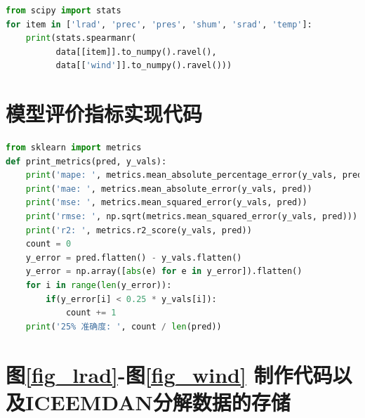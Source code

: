 \documentclass[AutoFakeBold]{LZUThesis}
\begin{document}
\begin{lstlisting}[language = python]
from scipy import stats
for item in ['lrad', 'prec', 'pres', 'shum', 'srad', 'temp']:
    print(stats.spearmanr(
          data[[item]].to_numpy().ravel(),
          data[['wind']].to_numpy().ravel()))
\end{lstlisting}

\section{模型评价指标实现代码}

\begin{lstlisting}[language = python]
from sklearn import metrics
def print_metrics(pred, y_vals):
    print('mape: ', metrics.mean_absolute_percentage_error(y_vals, pred))
    print('mae: ', metrics.mean_absolute_error(y_vals, pred))
    print('mse: ', metrics.mean_squared_error(y_vals, pred))
    print('rmse: ', np.sqrt(metrics.mean_squared_error(y_vals, pred)))
    print('r2: ', metrics.r2_score(y_vals, pred))
    count = 0
    y_error = pred.flatten() - y_vals.flatten()
    y_error = np.array([abs(e) for e in y_error]).flatten()
    for i in range(len(y_error)):
        if(y_error[i] < 0.25 * y_vals[i]):
            count += 1
    print('25% 准确度: ', count / len(pred))
\end{lstlisting}

\section{图\ref{fig_lrad}-图\ref{fig_wind} 制作代码以及ICEEMDAN分解数据的存储}
\end{document}
